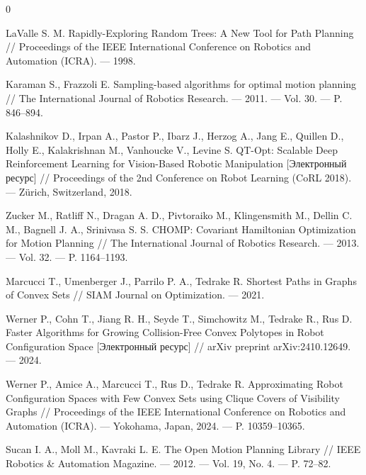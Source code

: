 \documentclass[a4paper,12pt]{extarticle}
\begin{document}
\begin{thebibliography}{0}

\hypertarget{lavalle1998}{}
LaValle S. M.
Rapidly-Exploring Random Trees: A New Tool for Path Planning //
Proceedings of the IEEE International Conference on Robotics and Automation (ICRA). — 1998.

\hypertarget{karaman2011}{}
Karaman S., Frazzoli E.
Sampling-based algorithms for optimal motion planning //
The International Journal of Robotics Research. — 2011. — Vol. 30. — P. 846--894.

\hypertarget{kalashnikov2018}{}
Kalashnikov D., Irpan A., Pastor P., Ibarz J., Herzog A., Jang E., Quillen D., Holly E.,
Kalakrishnan M., Vanhoucke V., Levine S.
QT-Opt: Scalable Deep Reinforcement Learning for Vision-Based Robotic Manipulation
[Электронный ресурс] //
Proceedings of the 2nd Conference on Robot Learning (CoRL 2018). — Zürich, Switzerland, 2018.

\hypertarget{zucker2013}{}
Zucker M., Ratliff N., Dragan A. D., Pivtoraiko M., Klingensmith M., Dellin C. M.,
Bagnell J. A., Srinivasa S. S.
CHOMP: Covariant Hamiltonian Optimization for Motion Planning //
The International Journal of Robotics Research. — 2013. — Vol. 32. — P. 1164--1193.

\hypertarget{marcucci2021}{}
Marcucci T., Umenberger J., Parrilo P. A., Tedrake R.
Shortest Paths in Graphs of Convex Sets //
SIAM Journal on Optimization. — 2021.

\hypertarget{werner2024}{}
Werner P., Cohn T., Jiang R. H., Seyde T., Simchowitz M., Tedrake R., Rus D.
Faster Algorithms for Growing Collision-Free Convex Polytopes in Robot Configuration Space
[Электронный ресурс] //
arXiv preprint arXiv:2410.12649. — 2024.

\hypertarget{werner2024clique}{}
Werner P., Amice A., Marcucci T., Rus D., Tedrake R.
Approximating Robot Configuration Spaces with Few Convex Sets using Clique Covers of Visibility Graphs //
Proceedings of the IEEE International Conference on Robotics and Automation (ICRA). — Yokohama, Japan, 2024. — P. 10359--10365.

\hypertarget{sucan2012}{}
Sucan I. A., Moll M., Kavraki L. E.
The Open Motion Planning Library //
IEEE Robotics \& Automation Magazine. — 2012. —
Vol. 19, No. 4. — P. 72--82.


\end{thebibliography}
\end{document}
